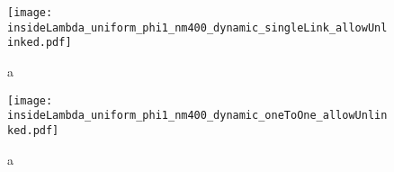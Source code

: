 \begin{figure}
  \centering
  \texttt{[image: insideLambda\_uniform\_phi1\_nm400\_dynamic\_singleLink\_allowUnlinked.pdf]}
  \caption{a}
  \label{fig:insideLambda_uniform_phi1_nm400_dynamic_singleLink_allowUnlinked}
\end{figure}

\begin{figure}
  \centering
  \texttt{[image: insideLambda\_uniform\_phi1\_nm400\_dynamic\_oneToOne\_allowUnlinked.pdf]}
  \caption{a}
  \label{fig:insideLambda_uniform_phi1_nm400_dynamic_oneToOne_allowUnlinked}
\end{figure}

